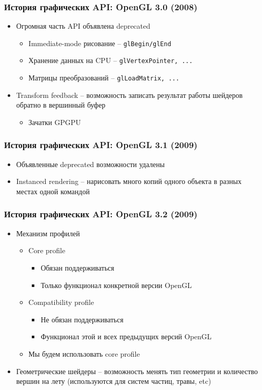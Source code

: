 \documentclass{beamer}
\begin{document}
\begin{frame}[fragile]
\frametitle{История графических API: OpenGL 3.0 (2008)}
\begin{itemize}
\item Огромная часть API объявлена deprecated
\pause
\begin{itemize}
\item Immediate-mode рисование -- \verb|glBegin/glEnd|
\item Хранение данных на CPU -- \verb|glVertexPointer, ...|
\item Матрицы преобразований -- \verb|glLoadMatrix, ...|
\end{itemize}
\pause
\item Transform feedback -- возможность записать результат работы шейдеров обратно в вершинный буфер
\begin{itemize}
\item Зачатки GPGPU
\end{itemize}
\end{itemize}
\end{frame}

\begin{frame}
\frametitle{История графических API: OpenGL 3.1 (2009)}
\begin{itemize}
\item Объявленные deprecated возможности удалены
\pause
\item Instanced rendering -- нарисовать много копий одного объекта в разных местах одной командой
\end{itemize}
\end{frame}

\begin{frame}
\frametitle{История графических API: OpenGL 3.2 (2009)}
\begin{itemize}
\item Механизм профилей
\begin{itemize}
\item Core profile
\begin{itemize}
\item Обязан поддерживаться
\item Только функционал конкретной версии OpenGL
\end{itemize}
\item Compatibility profile
\begin{itemize}
\item Не обязан поддерживаться
\item Функционал этой и всех предыдущих версий OpenGL
\end{itemize}
\pause
\item Мы будем использовать core profile
\end{itemize}
\pause
\item Геометрические шейдеры -- возможность менять тип геометрии и количество вершин на лету (используются для систем частиц, травы, etc)
\end{itemize}
\end{frame}
\end{document}
